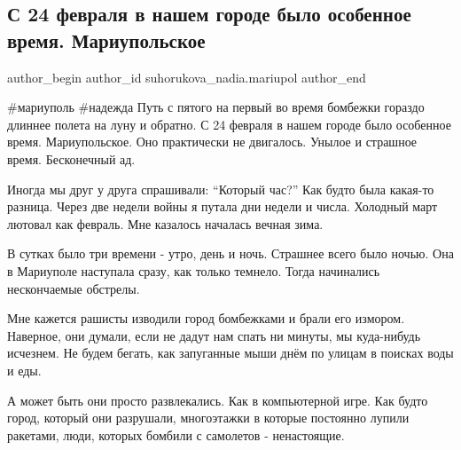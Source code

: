  
 
 
 
 
 
\subsection{С 24 февраля в нашем городе было особенное время. Мариупольское}
\label{sec:28_05_2022.fb.suhorukova_nadia.mariupol.1.vremja_gorod}
 
\ifcmt
 author_begin
   author_id suhorukova_nadia.mariupol
 author_end
\fi

\#мариуполь \#надежда Путь с пятого на первый во время бомбежки гораздо длиннее
полета на луну и обратно. С 24 февраля в нашем городе было особенное время.
Мариупольское. Оно практически не двигалось. Унылое и страшное время.
Бесконечный ад. 


Иногда мы друг у друга спрашивали:  \enquote{Который час?} Как будто была
какая-то разница. Через две недели войны я путала дни недели и числа. Холодный
март лютовал как февраль. Мне казалось началась вечная зима. 


В сутках было три времени  - утро, день и ночь. Страшнее всего было ночью. Она
в Мариуполе наступала сразу, как только темнело.  Тогда  начинались
нескончаемые  обстрелы. 

Мне кажется рашисты изводили город бомбежками и брали его измором. Наверное,
они думали,  если не дадут нам спать ни минуты, мы куда-нибудь исчезнем. Не
будем бегать, как запуганные мыши днём  по улицам в поисках воды и еды. 


А может быть они просто развлекались. Как в компьютерной игре. Как будто город,
который они разрушали, многоэтажки в которые постоянно лупили ракетами, люди,
которых бомбили с самолетов -  ненастоящие. 

